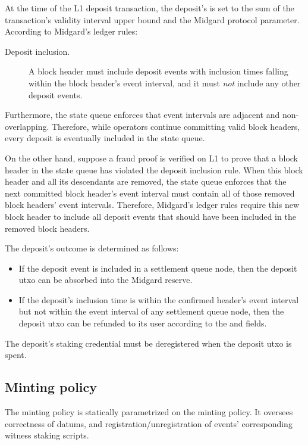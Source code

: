 \documentclass[../midgard.tex]{subfiles}
\begin{document}
At the time of the L1 deposit transaction, the deposit's  is set to the sum of the transaction's validity interval upper bound and the  Midgard protocol parameter.
According to Midgard's ledger rules:
\begin{description}
    \item[Deposit inclusion.] A block header must include deposit events with inclusion times falling within the block header's event interval, and it must \emph{not} include any other deposit events.
\end{description}

Furthermore, the state queue enforces that event intervals are adjacent and non-overlapping.
Therefore, while operators continue committing valid block headers, every deposit is eventually included in the state queue.

On the other hand, suppose a fraud proof is verified on L1 to prove that a block header in the state queue has violated the deposit inclusion rule.
When this block header and all its descendants are removed, the state queue enforces that the next committed block header's event interval must contain all of those removed block headers' event intervals.
Therefore, Midgard's ledger rules require this new block header to include all deposit events that should have been included in the removed block headers.

The deposit's outcome is determined as follows:
\begin{itemize}
    \item If the deposit event is included in a settlement queue node, then the deposit utxo can be absorbed into the Midgard reserve.
    \item If the deposit's inclusion time is within the confirmed header's event interval but not within the event interval of any settlement queue node, then the deposit utxo can be refunded to its user according to the  and  fields.
\end{itemize}

The deposit's  staking credential must be deregistered when the deposit utxo is spent.

\subsection{Minting policy}
\label{h:deposit-minting-policy}

The  minting policy is statically parametrized on the  minting policy.
It oversees correctness of datums, and registration/unregistration of events' corresponding witness staking scripts.
\end{document}
